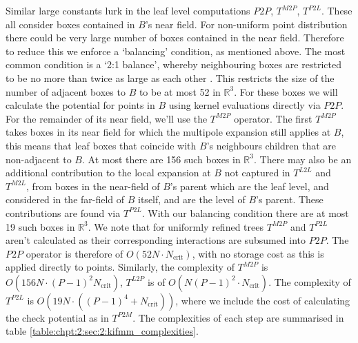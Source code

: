 Similar large constants lurk in the leaf level computations $P2P$, $T^{M2P}$, $T^{P2L}$. These all consider boxes contained in $B$'s near field. For non-uniform point distribution there could be very large number of boxes contained in the near field. Therefore to reduce this we enforce a `balancing' condition, as mentioned above. The most common condition is a `2:1 balance', whereby neighbouring boxes are restricted to be no more than twice as large as each other \cite{malhotra2015pvfmm}. This restricts the size of the number of adjacent boxes to $B$ to be at most 52 in $\mathbb{R}^3$. For these boxes we will calculate the potential for points in $B$ using kernel evaluations directly via $P2P$. For the remainder of its near field, we'll use the $T^{M2P}$ operator. The first $T^{M2P}$ takes boxes in its near field for which the multipole expansion still applies at $B$, this means that leaf boxes that coincide with $B$'s neighbours children that are non-adjacent to $B$. At most there are 156 such boxes in $\mathbb{R}^3$. There may also be an additional contribution to the local expansion at $B$ not captured in $T^{L2L}$ and $T^{M2L}$, from boxes in the near-field of $B$'s parent which are the leaf level, and considered in the far-field of $B$ itself, and are the level of $B$'s parent. These contributions are found via $T^{P2L}$. With our balancing condition there are at most 19 such boxes in $\mathbb{R}^3$. We note that for uniformly refined trees $T^{M2P}$ and $T^{P2L}$ aren't calculated as their corresponding interactions are subsumed into $P2P$. The $P2P$ operator is therefore of $O(52 N \cdot N_{\text{crit}})$, with no storage cost as this is applied directly to points. Similarly, the complexity of $T^{M2P}$ is $O(156 N \cdot (P-1)^2 N_\text{crit})$, $T^{L2P}$ is of $O(N (P-1)^2 \cdot N_\text{crit})$. The complexity of $T^{P2L}$ is $O(19 N \cdot ((P-1)^4 + N_\text{crit}))$, where we include the cost of calculating the check potential as in $T^{P2M}$. The complexities of each step are summarised in table \ref{table:chpt:2:sec:2:kifmm_complexities}.

